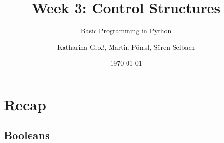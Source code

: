 



\title[Introduction]{Week 3: Control Structures}
\subtitle{Basic Programming in Python}

\author[kgross, mpoemsl, sselbach]{Katharina Groß, Martin Pömsl, Sören Selbach}

\date{\today}

\begin{frame}[plain]
    \titlepage
\end{frame}

\begin{frame}
    \tableofcontents
\end{frame}

\section{Recap}

\subsection{Booleans}

